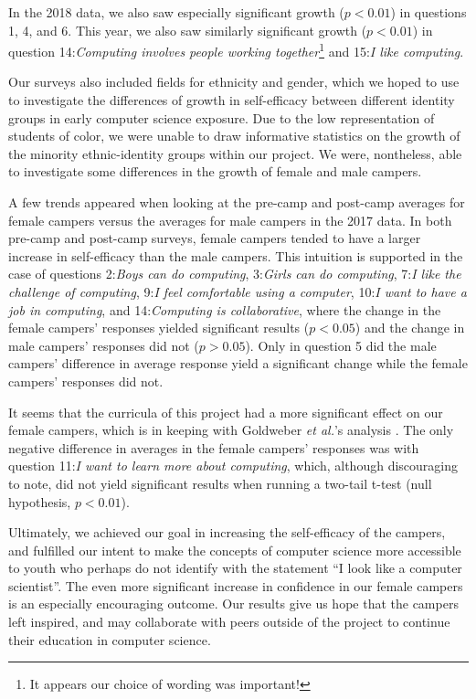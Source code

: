 In the 2018 data, we also saw especially significant growth ($p <
0.01$) in questions 1, 4, and 6.  This year, we also saw similarly
significant growth ($p < 0.01$) in question 14:\textit{Computing
involves people working together}\footnote{It appears our choice
of wording was important!} and 15:\textit{I like computing}.

Our surveys also included fields for ethnicity and gender, which
we hoped to use to investigate the differences of growth in
self-efficacy between different identity groups in early computer
science exposure. Due to the low representation of students of
color, we were unable to draw informative statistics on the growth
of the minority ethnic-identity groups within our project. We were,
nontheless, able to investigate some differences in the growth of
female and male campers.

A few trends appeared when looking at the pre-camp and post-camp
averages for female campers versus the averages for male campers
in the 2017 data.  In both pre-camp and post-camp surveys, female
campers tended to have a larger increase in self-efficacy than the
male campers. This intuition is supported in the case of questions
2:\textit{Boys can do computing}, 3:\textit{Girls can do computing},
7:\textit{I like the challenge of computing}, 9:\textit{I feel
comfortable using a computer}, 10:\textit{I want to have a job in
computing}, and 14:\textit{Computing is collaborative}, where the
change in the female campers' responses yielded significant results
($p < 0.05$) and the change in male campers' responses did not ($p
> 0.05$). Only in question 5 did the male campers' difference in
average response yield a significant change while the female campers'
responses did not.

It seems that the curricula of this project had a more significant
effect on our female campers, which is in keeping with Goldweber
\textit{et al.}'s analysis \cite{Goldweber2013}.  The only negative
difference in averages in the female campers' responses was with
question 11:\textit{I want to learn more about computing}, which,
although discouraging to note, did not yield significant results
when running a two-tail t-test (null hypothesis, $p < 0.01$).

Ultimately, we achieved our goal in increasing the self-efficacy
of the campers, and fulfilled our intent to make the concepts of
computer science more accessible to youth who perhaps do not identify
with the statement ``I look like a computer scientist''. The even
more significant increase in confidence in our female campers is
an especially encouraging outcome. Our results give us hope that
the campers left inspired, and may collaborate with peers outside
of the project to continue their education in computer science.

